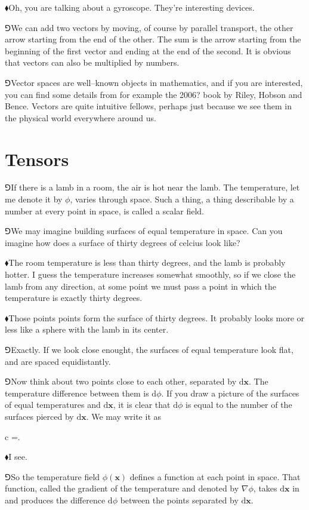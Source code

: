 \documentclass[11pt,oneside%
]{memoir}
\newenvironment{eqna}{\begin{IEEEeqnarray*}{c}}{\end{IEEEeqnarray*}\ignorespacesafterend}
\newcommand{\dd}{\mathrm{d}}
\renewcommand{\vec}[1]{\mathbf{#1}}
\newcommand{\hea}{\(\blacklozenge\)\;}
\newcommand{\heb}{\(\Game\)\;}
\begin{document}
\hea Oh, you are talking about a gyroscope. They're interesting devices.

\heb We can add two vectors by moving, of course by parallel transport, the other arrow starting from the end of the other. The sum is the arrow starting from the beginning of the first vector and ending at the end of the second. It is obvious that vectors can also be multiplied by numbers.

\heb Vector spaces are well--known objects in mathematics, and if you are interested, you can find some details from for example the 2006? book by Riley, Hobson and Bence. Vectors are quite intuitive fellows, perhaps just because we see them in the physical world everywhere around us.
\section{Tensors}
\heb If there is a lamb in a room, the air is hot near the lamb. The temperature, let me denote it by \(\phi\), varies through space. Such a thing, a thing describable by a number at every point in space, is called a scalar field.

\heb We may imagine building surfaces of equal temperature in space. Can you imagine how does a surface of thirty degrees of celcius look like?

\hea The room temperature is less than thirty degrees, and the lamb is probably hotter. I guess the temperature increases somewhat smoothly, so if we close the lamb from any direction, at some point we must pass a point in which the temperature is exactly thirty degrees.

\hea Those points points form the surface of thirty degrees. It probably looks more or less like a sphere with the lamb in its center.

\heb Exactly. If we look close enought, the surfaces of equal temperature look flat, and are spaced equidistantly.

\heb Now think about two points close to each other, separated by \(\dd\vec{x}\). The temperature difference between them is \(\dd\phi\). If you draw a picture of the surfaces of equal temperatures and \(\dd\vec{x}\), it is clear that \(\dd\phi\) is equal to the number of the surfaces pierced by \(\dd\vec{x}\). We may write it as
\begin{eqna}
    \dd\phi=\nabla\phi\cdot\dd\vec{x}.
\end{eqna}

\hea I see.

\heb So the temperature field \(\phi(\vec{x})\) defines a function at each point in space. That function, called the gradient of the temperature and denoted by \(\nabla\phi\), takes \(\dd\vec{x}\) in and produces the difference \(\dd\phi\) between the points separated by \(\dd\vec{x}\).
\end{document}

